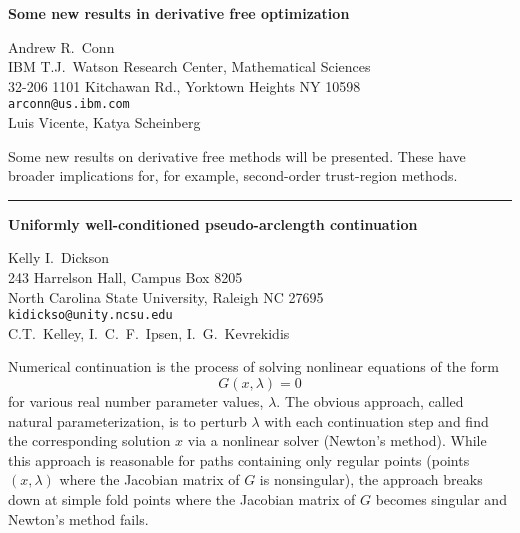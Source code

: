 \documentclass[twosided]{report}
\begin{document}
\begin{center}
{\large			%
{\bf Some new results in derivative free optimization}}

	Andrew R.~Conn \\
	IBM T.J.~Watson Research Center, Mathematical Sciences \\
	32-206 1101 Kitchawan Rd., Yorktown Heights NY 10598 \\
	{\tt arconn@us.ibm.com} \\
	Luis Vicente, Katya Scheinberg
\end{center}
Some new results on derivative free methods will be
presented. These have broader implications for, for example,
second-order trust-region methods.



	\begin{center} \rule{6in}{1pt} \end{center}

\begin{center}
{\large			%
{\bf Uniformly well-conditioned pseudo-arclength continuation}}

	Kelly I.~Dickson \\
	243 Harrelson Hall, Campus Box 8205 \\
	North Carolina State University, Raleigh NC 27695 \\
	{\tt kidickso@unity.ncsu.edu} \\
	C.T.~Kelley, I.~C.~F.~Ipsen, I.~G.~Kevrekidis
\end{center}
Numerical continuation is the process of solving nonlinear
equations of the form \[G(x,\lambda)=0\] for various real
number parameter values, $\lambda$. The obvious approach,
called natural parameterization, is to perturb $\lambda$
with each continuation step and find the corresponding
solution $x$ via a nonlinear solver (Newton's method). While
this approach is reasonable for paths containing only
regular points (points $(x,\lambda)$ where the Jacobian
matrix of $G$ is nonsingular), the approach breaks down at
simple fold points where the Jacobian matrix of $G$ becomes
singular and Newton's method fails.
\end{document}
